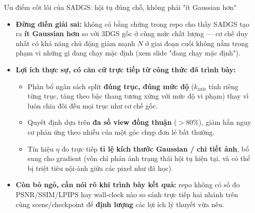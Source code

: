 \begin{frame}{Ưu điểm cốt lõi của SADGS: hội tụ đúng chỗ, không phải "ít Gaussian hơn"}
\scriptsize
\begin{itemize}\itemsep2pt
    \item \textbf{Đừng diễn giải sai:} không có bằng chứng trong repo cho thấy SADGS tạo ra \textbf{ít Gaussian hơn} so
    với 3DGS gốc ở cùng mức chất lượng --- cơ chế duy nhất có khả năng chủ động giảm mạnh $N$ ở giai đoạn cuối không
    nằm trong phạm vi những gì đang chạy mặc định (xem slide "đang chạy mặc định").
    \item \textbf{Lợi ích thực sự, có căn cứ trực tiếp từ công thức đã trình bày:}
    \begin{itemize}
        \item Phân bổ ngân sách split \textbf{đúng trục, đúng mức độ} ($k_{\text{axis}}$ tính riêng từng trục, tăng
        theo bậc thang tương xứng với mức độ vi phạm) thay vì luôn chia đôi đều mọi trục như cơ chế gốc.
        \item Quyết định dựa trên \textbf{đa số view đồng thuận} ($>80\%$), giảm hẳn nguy cơ phản ứng theo nhiễu của một
        góc chụp đơn lẻ bất thường.
        \item Tín hiệu $\eta$ đo trực tiếp \textbf{tỉ lệ kích thước Gaussian / chi tiết ảnh}, bổ sung cho gradient (vốn
        chỉ phản ánh trạng thái hội tụ hiện tại, và có thể bị triệt tiêu nội-ảnh giữa các pixel như đã học).
    \end{itemize}
    \item \textbf{Còn bỏ ngỏ, cần nói rõ khi trình bày kết quả:} repo không có số đo PSNR/SSIM/LPIPS hay wall-clock nào
    so sánh trực tiếp hai nhánh trên cùng scene/checkpoint để \textbf{định lượng} các lợi ích lý thuyết vừa nêu.
\end{itemize}
\end{frame}

